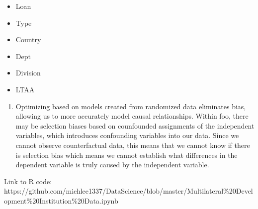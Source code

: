 \documentclass[11pt]{article}
\providecommand{\tightlist}{%
      \setlength{\itemsep}{0pt}\setlength{\parskip}{0pt}}
\begin{document}
\begin{itemize}
\tightlist
\item
  Loan
\item
  Type
\item
  Country
\item
  Dept
\item
  Division
\item
  LTAA
\end{itemize}

\begin{enumerate}
\def\labelenumi{(\alph{enumi})}
\setcounter{enumi}{4}
\tightlist
\item
  Optimizing based on models created from randomized data eliminates
  bias, allowing us to more accurately model causal relationships.
  Within foo, there may be selection biases based on counfounded
  assignments of the independent variables, which introduces confounding
  variables into our data. Since we cannot observe counterfactual data,
  this means that we cannot know if there is selection bias which means
  we cannot establish what differences in the dependent variable is
  truly caused by the independent variable.
\end{enumerate}

    Link to R code:
https://github.com/michlee1337/DataScience/blob/master/Multilateral\%20Development\%20Institution\%20Data.ipynb


    
    
    
    
\end{document}
